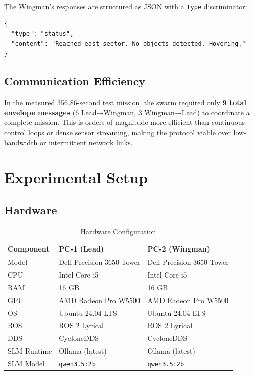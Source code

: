 \documentclass[conference]{IEEEtran}
\begin{document}
The Wingman's responses are structured as JSON with a \texttt{type} discriminator:

\begin{lstlisting}[caption={Wingman-to-Lead status envelope example.}]
{
  "type": "status",
  "content": "Reached east sector. No objects detected. Hovering."
}
\end{lstlisting}

\subsection{Communication Efficiency}

In the measured 356.86-second test mission, the swarm required only \textbf{9 total envelope messages} (6 Lead→Wingman, 3 Wingman→Lead) to coordinate a complete mission. This is orders of magnitude more efficient than continuous control loops or dense sensor streaming, making the protocol viable over low-bandwidth or intermittent network links.

\section{Experimental Setup}
\label{sec:setup}

\subsection{Hardware}

\begin{table}[htbp]
\caption{Hardware Configuration}
\label{tab:hw}
\centering
\begin{tabular}{@{}lp{2.2cm}p{2.2cm}@{}}
\toprule
\textbf{Component} & \textbf{PC-1 (Lead)} & \textbf{PC-2 (Wingman)} \\
\midrule
Model & Dell Precision 3650 Tower & Dell Precision 3650 Tower \\
CPU & Intel Core i5 & Intel Core i5 \\
RAM & 16 GB & 16 GB \\
GPU & AMD Radeon Pro W5500 & AMD Radeon Pro W5500 \\
OS & Ubuntu 24.04 LTS & Ubuntu 24.04 LTS \\
ROS & ROS 2 Lyrical & ROS 2 Lyrical \\
DDS & CycloneDDS & CycloneDDS \\
SLM Runtime & Ollama (latest) & Ollama (latest) \\
SLM Model & \texttt{qwen3.5:2b} & \texttt{qwen3.5:2b} \\
\bottomrule
\end{tabular}
\end{table}
\end{document}
